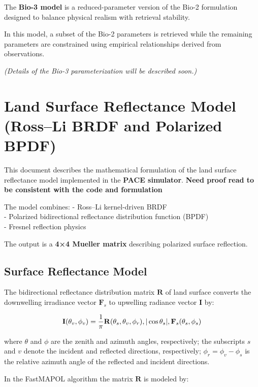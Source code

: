 \documentclass[
  letterpaper,
]{scrbook}
\begin{document}
The \textbf{Bio-3 model} is a reduced-parameter version of the Bio-2
formulation designed to balance physical realism with retrieval
stability.

In this model, a subset of the Bio-2 parameters is retrieved while the
remaining parameters are constrained using empirical relationships
derived from observations.

\emph{(Details of the Bio-3 parameterization will be described soon.)}

\chapter{Land Surface Reflectance Model (Ross--Li BRDF and Polarized
BPDF)}\label{land-surface-reflectance-model-rossli-brdf-and-polarized-bpdf}

This document describes the mathematical formulation of the land surface
reflectance model implemented in the \textbf{PACE simulator}.
\textbf{Need proof read to be consistent with the code and formulation}

The model combines: - Ross--Li kernel-driven BRDF\\
- Polarized bidirectional reflectance distribution function (BPDF)\\
- Fresnel reflection physics

The output is a \textbf{4×4 Mueller matrix} describing polarized surface
reflection.

\section{Surface Reflectance Model}\label{surface-reflectance-model}

The bidirectional reflectance distribution matrix \(\mathbf{R}\) of land
surface converts the downwelling irradiance vector \(\mathbf{F}_s\) to
upwelling radiance vector \(\mathbf{I}\) by:

\[
\mathbf{I}(\theta_v,\phi_v)= \frac{1}{\pi}\mathbf{R}(\theta_s,\theta_v,\phi_r) \\, |\cos\theta_s| \\, \mathbf{F}_s(\theta_s,\phi_s) 
\]

where \(\theta\) and \(\phi\) are the zenith and azimuth angles,
respectively; the subscripts \(s\) and \(v\) denote the incident and
reflected directions, respectively; \(\phi_r=\phi_v-\phi_s\) is the
relative azimuth angle of the reflected and incident directions.

In the FastMAPOL algorithm the matrix \(\mathbf{R}\) is modeled by:
\end{document}
